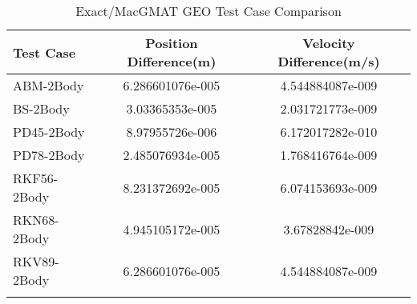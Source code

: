 \begin{table}[htbp!]
\centering
\caption{ Exact/MacGMAT GEO Test Case Comparison}
      \begin{tabular}{lcc}
      \hline\hline
          Test Case & Position Difference(m) & Velocity Difference(m/s) \\
         \hline
         ABM-2Body & 6.286601076e-005 & 4.544884087e-009 \\
         BS-2Body & 3.03365353e-005 & 2.031721773e-009 \\
         PD45-2Body & 8.97955726e-006 & 6.172017282e-010 \\
         PD78-2Body & 2.485076934e-005 & 1.768416764e-009 \\
         RKF56-2Body & 8.231372692e-005 & 6.074153693e-009 \\
         RKN68-2Body & 4.945105172e-005 & 3.67828842e-009 \\
         RKV89-2Body & 6.286601076e-005 & 4.544884087e-009 \\
      \hline\hline
      \label{Table: GEO Exact-MacGMAT Table} 
\end{tabular}
\end{table}
